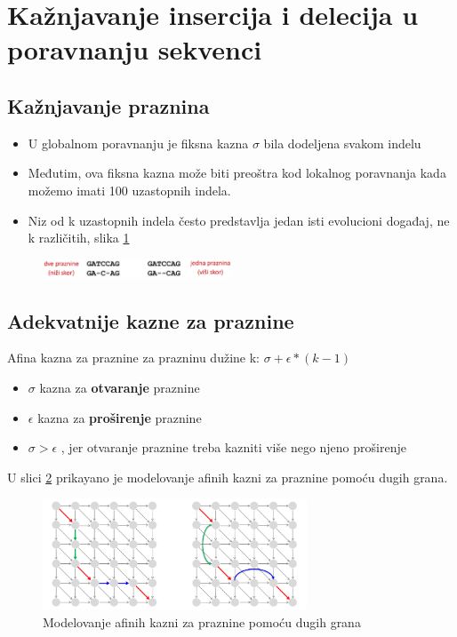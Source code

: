 \section{Kažnjavanje insercija i delecija u poravnanju sekvenci}

\subsection{Kažnjavanje praznina}

\begin{itemize}
    \item U globalnom poravnanju je fiksna kazna $\sigma$ bila dodeljena svakom indelu
    \item Međutim, ova fiksna kazna može biti preoštra
kod lokalnog poravnanja kada možemo imati 100 uzastopnih indela.
    \item Niz od k uzastopnih indela često predstavlja jedan isti evolucioni događaj, ne k različitih, slika \ref{slika:kaznjavanje}
\end{itemize}

\begin{figure}[]
\centering
\includegraphics[width=0.5\textwidth]{poglavlja/5/slike/kaznjavanjePraznina.png}
\caption{}
\label{slika:kaznjavanje}
\end{figure}

\subsection{Adekvatnije kazne za praznine}

Afina kazna za praznine za prazninu dužine k:  \textbf{$\sigma+\epsilon*(k-1)$}
\begin{itemize}
    \item $\sigma$ kazna za \textbf{otvaranje} praznine
    \item $\epsilon$ kazna za \textbf{proširenje} praznine
    \item $ \sigma > \epsilon$ , jer otvaranje praznine treba kazniti više nego njeno proširenje
\end{itemize}



U slici \ref{slika:modelovanje} prikayano je modelovanje afinih kazni za praznine pomoću dugih grana.

\begin{figure}[]
\centering
\includegraphics[width=0.7\textwidth]{poglavlja/5/slike/modelovanjePomocuDugihGrana.png}
\caption{Modelovanje afinih kazni za praznine pomoću dugih grana}
\label{slika:modelovanje}
\end{figure}

